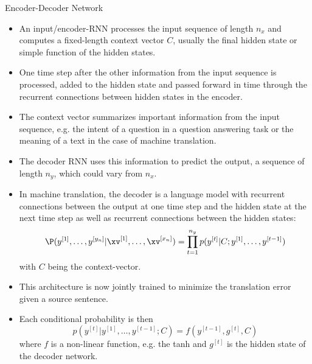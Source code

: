 \begin{vbframe}{Encoder-Decoder Network}
\begin{itemize}
    \item An input/encoder-RNN processes the input sequence of length $n_x$ and computes a fixed-length context vector $C$, usually the final hidden state or  simple function of the hidden states.
    \item One time step after the other information from the input sequence is processed, added to the hidden state and passed forward in time through the recurrent connections between hidden states in the encoder.
    \item  The context vector summarizes important information from the input sequence, e.g. the intent of a question in a question answering task or the meaning of a text in the case of machine translation.
    \item The decoder RNN uses this information to predict the output, a sequence of length $n_y$, which could vary from $n_x$. 
    \item In machine translation, the decoder is a language model with recurrent connections between the output at one time step and the hidden state at the next time step as well as recurrent connections between the hidden states:
    $$\P(y^{[1]}, \dots, y^{[y_n]}|\xv^{[1]}, \dots, \xv^{[x_n]}) = \displaystyle \prod_{t=1}^{n_y} p(y^{[t]}|C; y^{[1]}, \dots, y^{[t-1]})$$ with $C$ being the context-vector.
    \item This architecture is now jointly trained to minimize the translation
error given a source sentence.
    \item Each conditional probability is then $$p(y^{[t]}|y^{[1]}, \dots, y^{[t-1]};C) = f(y^{[t-1]}, g^{[t]}, C)$$ where $f$ is a non-linear function, e.g. the tanh and $g^{[t]}$ is the hidden state of the decoder network.
  \end{itemize}
\end{vbframe}





